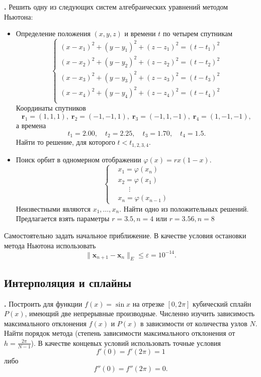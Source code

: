 \documentclass[12pt]{article}
\newcounter{task}
\newcommand{\problem}{\par\textbf{\stepcounter{task}\thetask. }}
\begin{document}
\problem Решить одну из следующих систем алгебраических уравнений методом Ньютона:
\begin{itemize}
\item Определение положения $(x,y,z)$ и времени $t$ по четырем спутникам
\[\left\{
\begin{aligned}
(x - x_1)^2 + (y - y_1)^2 + (z - z_1)^2 = (t - t_1)^2\\
(x - x_2)^2 + (y - y_2)^2 + (z - z_2)^2 = (t - t_2)^2\\
(x - x_3)^2 + (y - y_3)^2 + (z - z_3)^2 = (t - t_3)^2\\
(x - x_4)^2 + (y - y_4)^2 + (z - z_4)^2 = (t - t_4)^2\\
\end{aligned}
\right.
\]
Координаты спутников 
$$
\mathbf r_1 = (1, 1, 1), \;
\mathbf r_2 = (-1, -1, 1), \;
\mathbf r_3 = (-1, 1, -1), \;
\mathbf r_4 = (1, -1, -1),
$$
а времена 
$$
t_1 = 2.00, \quad t_2 = 2.25, \quad t_3 = 1.70, \quad t_4 = 1.5.
$$
Найти то решение, для которого $t < t_{1,2,3,4}$.
\item Поиск орбит в одномерном отображении $\varphi(x) = r x (1 - x)$. 
\[\left\{\begin{aligned}
&x_1 = \varphi(x_n)\\
&x_2 = \varphi(x_1)\\
&\;\;\quad\vdots\\
&x_n = \varphi(x_{n-1})
\end{aligned}
\right.\]
Неизвестными являются $x_1, \dots, x_n$. Найти одно из положительных решений. Предлагается взять параметры $r = 3.5, n = 4$ или $r = 3.56, n = 8$
\end{itemize}
Самостоятельно задать начальное приближение. В качестве условия остановки метода Ньютона использовать
$$
\|\mathbf x_{n+1} - \mathbf x_{n}\|_E \leqslant \varepsilon = 10^{-14}.
$$

\subsection{Интерполяция и сплайны}

\problem Построить для функции $f(x) = \sin x$ на отрезке $[0, 2\pi]$ кубический
сплайн $P(x)$, имеющий две непрерывные производные. Численно изучить зависимость
максимального отклонения $f(x)$ и $P(x)$ в зависимости от количества узлов $N$.
Найти порядок метода (степень зависимости максимального отклонения от
$h = \frac{2\pi}{N - 1}$). В качестве концевых условий использовать точные
условия
\[
f'(0) = f'(2\pi) = 1
\]
либо
\[
f''(0) = f''(2\pi) = 0.
\]
\end{document}
